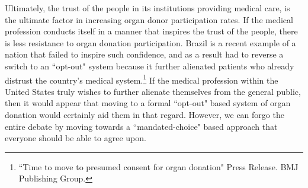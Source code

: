 \documentclass[letterpaper,10pt,twoside]{article}
\begin{document}
Ultimately, the trust of the people in its institutions providing medical care, is the ultimate factor in increasing organ donor participation rates.  If the medical profession conducts itself in a manner that inspires the trust of the people, there is less resistance to organ donation participation.  Brazil is a recent example of a nation that failed to inspire such confidence, and as a result had to reverse a switch to an ``opt-out" system because it further alienated patients who already distrust the country's medical system.\footnote{``Time to move to presumed consent for organ donation" Press Release. BMJ Publishing Group.}  If the medical profession within the United States truly wishes to further alienate themselves from the general public, then it would appear that moving to a formal ``opt-out" based system of organ donation would certainly aid them in that regard.  However, we can forgo the entire debate by moving towards a ``mandated-choice" based approach that everyone should be able to agree upon.
\end{document}

